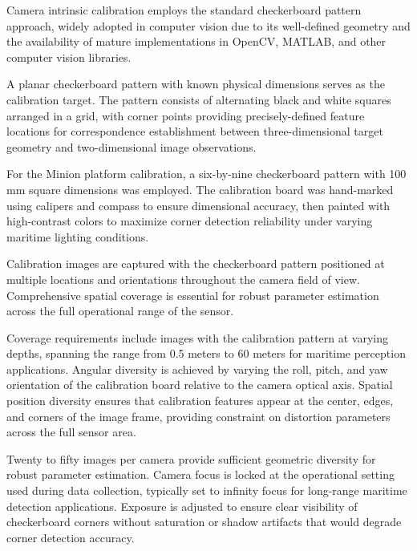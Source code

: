 
Camera intrinsic calibration employs the standard checkerboard pattern approach, widely adopted in computer vision due to its well-defined geometry and the availability of mature implementations in OpenCV, MATLAB, and other computer vision libraries.


A planar checkerboard pattern with known physical dimensions serves as the calibration target.
The pattern consists of alternating black and white squares arranged in a grid, with corner points providing precisely-defined feature locations for correspondence establishment between three-dimensional target geometry and two-dimensional image observations.

For the Minion platform calibration, a six-by-nine checkerboard pattern with 100 mm square dimensions was employed.
The calibration board was hand-marked using calipers and compass to ensure dimensional accuracy, then painted with high-contrast colors to maximize corner detection reliability under varying maritime lighting conditions.


Calibration images are captured with the checkerboard pattern positioned at multiple locations and orientations throughout the camera field of view.
Comprehensive spatial coverage is essential for robust parameter estimation across the full operational range of the sensor.

Coverage requirements include images with the calibration pattern at varying depths, spanning the range from 0.5 meters to 60 meters for maritime perception applications.
Angular diversity is achieved by varying the roll, pitch, and yaw orientation of the calibration board relative to the camera optical axis.
Spatial position diversity ensures that calibration features appear at the center, edges, and corners of the image frame, providing constraint on distortion parameters across the full sensor area.

Twenty to fifty images per camera provide sufficient geometric diversity for robust parameter estimation.
Camera focus is locked at the operational setting used during data collection, typically set to infinity focus for long-range maritime detection applications.
Exposure is adjusted to ensure clear visibility of checkerboard corners without saturation or shadow artifacts that would degrade corner detection accuracy.

